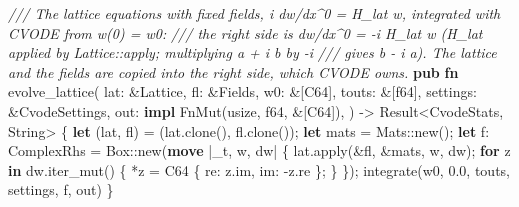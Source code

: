 \documentclass[
  10pt,
]{article}
\newenvironment{Shaded}{}{}
\newcommand{\BuiltInTok}[1]{\textcolor[rgb]{0.00,0.50,0.00}{#1}}
\newcommand{\CommentTok}[1]{\textcolor[rgb]{0.38,0.63,0.69}{\textit{#1}}}
\newcommand{\ControlFlowTok}[1]{\textcolor[rgb]{0.00,0.44,0.13}{\textbf{#1}}}
\newcommand{\DataTypeTok}[1]{\textcolor[rgb]{0.56,0.13,0.00}{#1}}
\newcommand{\DecValTok}[1]{\textcolor[rgb]{0.25,0.63,0.44}{#1}}
\newcommand{\KeywordTok}[1]{\textcolor[rgb]{0.00,0.44,0.13}{\textbf{#1}}}
\newcommand{\NormalTok}[1]{#1}
\newcommand{\OperatorTok}[1]{\textcolor[rgb]{0.40,0.40,0.40}{#1}}
\newcommand{\PreprocessorTok}[1]{\textcolor[rgb]{0.74,0.48,0.00}{#1}}
\begin{document}
\begin{Shaded}
\begin{Highlighting}[]
\CommentTok{/// The lattice equations with fixed fields, i dw/dx\^{}0 = H\_lat w, integrated with CVODE from w(0) = w0:}
\CommentTok{/// the right side is dw/dx\^{}0 = {-}i H\_lat w (H\_lat applied by \textasciigrave{}Lattice::apply\textasciigrave{}; multiplying a + i b by {-}i}
\CommentTok{/// gives b {-} i a).  The lattice and the fields are copied into the right side, which CVODE owns.}
\KeywordTok{pub} \KeywordTok{fn}\NormalTok{ evolve\_lattice(}
\NormalTok{    lat}\OperatorTok{:} \OperatorTok{\&}\NormalTok{Lattice}\OperatorTok{,}
\NormalTok{    fl}\OperatorTok{:} \OperatorTok{\&}\NormalTok{Fields}\OperatorTok{,}
\NormalTok{    w0}\OperatorTok{:} \OperatorTok{\&}\NormalTok{[C64]}\OperatorTok{,}
\NormalTok{    touts}\OperatorTok{:} \OperatorTok{\&}\NormalTok{[}\DataTypeTok{f64}\NormalTok{]}\OperatorTok{,}
\NormalTok{    settings}\OperatorTok{:} \OperatorTok{\&}\NormalTok{CvodeSettings}\OperatorTok{,}
\NormalTok{    out}\OperatorTok{:} \KeywordTok{impl} \BuiltInTok{FnMut}\NormalTok{(}\DataTypeTok{usize}\OperatorTok{,} \DataTypeTok{f64}\OperatorTok{,} \OperatorTok{\&}\NormalTok{[C64])}\OperatorTok{,}
\NormalTok{) }\OperatorTok{{-}\textgreater{}} \DataTypeTok{Result}\OperatorTok{\textless{}}\NormalTok{CvodeStats}\OperatorTok{,} \DataTypeTok{String}\OperatorTok{\textgreater{}} \OperatorTok{\{}
    \KeywordTok{let}\NormalTok{ (lat}\OperatorTok{,}\NormalTok{ fl) }\OperatorTok{=}\NormalTok{ (lat}\OperatorTok{.}\NormalTok{clone()}\OperatorTok{,}\NormalTok{ fl}\OperatorTok{.}\NormalTok{clone())}\OperatorTok{;}
    \KeywordTok{let}\NormalTok{ mats }\OperatorTok{=} \PreprocessorTok{Mats::}\NormalTok{new()}\OperatorTok{;}
    \KeywordTok{let}\NormalTok{ f}\OperatorTok{:}\NormalTok{ ComplexRhs }\OperatorTok{=} \DataTypeTok{Box}\PreprocessorTok{::}\NormalTok{new(}\KeywordTok{move} \OperatorTok{|}\NormalTok{\_t}\OperatorTok{,}\NormalTok{ w}\OperatorTok{,}\NormalTok{ dw}\OperatorTok{|} \OperatorTok{\{}
\NormalTok{        lat}\OperatorTok{.}\NormalTok{apply(}\OperatorTok{\&}\NormalTok{fl}\OperatorTok{,} \OperatorTok{\&}\NormalTok{mats}\OperatorTok{,}\NormalTok{ w}\OperatorTok{,}\NormalTok{ dw)}\OperatorTok{;}
        \ControlFlowTok{for}\NormalTok{ z }\KeywordTok{in}\NormalTok{ dw}\OperatorTok{.}\NormalTok{iter\_mut() }\OperatorTok{\{}
            \OperatorTok{*}\NormalTok{z }\OperatorTok{=}\NormalTok{ C64 }\OperatorTok{\{}\NormalTok{ re}\OperatorTok{:}\NormalTok{ z}\OperatorTok{.}\NormalTok{im}\OperatorTok{,}\NormalTok{ im}\OperatorTok{:} \OperatorTok{{-}}\NormalTok{z}\OperatorTok{.}\NormalTok{re }\OperatorTok{\};}
        \OperatorTok{\}}
    \OperatorTok{\}}\NormalTok{)}\OperatorTok{;}
\NormalTok{    integrate(w0}\OperatorTok{,} \DecValTok{0.0}\OperatorTok{,}\NormalTok{ touts}\OperatorTok{,}\NormalTok{ settings}\OperatorTok{,}\NormalTok{ f}\OperatorTok{,}\NormalTok{ out)}
\OperatorTok{\}}


\end{Highlighting}
\end{Shaded}
\end{document}
